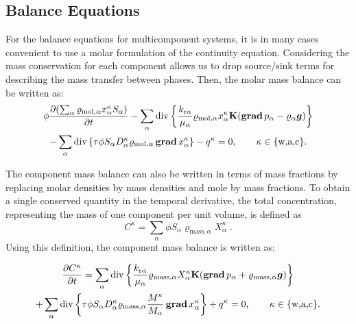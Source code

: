 \subsection{Balance Equations}
For the balance equations for multicomponent systems, it is in many
cases convenient to use a molar formulation of the continuity
equation. Considering the mass conservation for each component allows
us to drop source/sink terms for describing the mass transfer between
phases. Then, the
molar mass balance can be written as:
%
\begin{multline}
  \label{A3:eqmass1}
 \phi \frac{\partial (\sum_\alpha \varrho_{\text{mol}, \alpha}
    x_\alpha^\kappa S_\alpha )}{\partial t}  
 - \sum\limits_\alpha \operatorname{div} \left\lbrace \frac{k_{\text{r}
        \alpha}}{\mu_\alpha} \varrho_{\text{mol}, \alpha}
    x_\alpha^\kappa \textbf{K} (\operatorname{\bf grad} p_\alpha -
    \varrho_{\alpha} \boldsymbol{g}) \right\rbrace  \\
 - \sum\limits_\alpha \operatorname{div} \left\lbrace \tau \phi S_\alpha D_\alpha^\kappa \varrho_{\text{mol},
      \alpha} \operatorname{\bf grad} x_\alpha^\kappa \right\rbrace
 - q^\kappa = 0, \qquad \kappa \in \{\text{w,a,c}\}.
\end{multline}

The component mass balance can also be written in terms of mass fractions 
by replacing molar densities by mass densities and mole by mass fractions.
To obtain a single conserved quantity in the temporal derivative, the total 
concentration, representing the mass of one component per unit volume, is defined as
\begin{displaymath}
C^\kappa = \sum_\alpha \phi S_\alpha \varrho_{\text{mass},\alpha} X_\alpha^\kappa \; .
\end{displaymath}
Using this definition, the component mass balance is written as:

\begin{multline}
  \label{A3:eqmass2}
    \frac{\partial C^\kappa}{\partial t} = 
  \sum\limits_\alpha \operatorname{div} \left\lbrace \frac{k_{\text{r}
        \alpha}}{\mu_\alpha} \varrho_{\text{mass}, \alpha}
    X_\alpha^\kappa \textbf{K} (\operatorname{\bf grad} p_\alpha +
    \varrho_{\text{mass}, \alpha} \boldsymbol{g}) \right\rbrace  \\
   + \sum\limits_\alpha \operatorname{div} \left\lbrace \tau \phi S_\alpha D_\alpha^\kappa \varrho_{\text{mass},
      \alpha} \frac{M^\kappa}{M_\alpha} \operatorname{\bf grad} x_\alpha^\kappa \right\rbrace 
 + q^\kappa = 0, \qquad \kappa \in \{\text{w,a,c}\}.
\end{multline}


